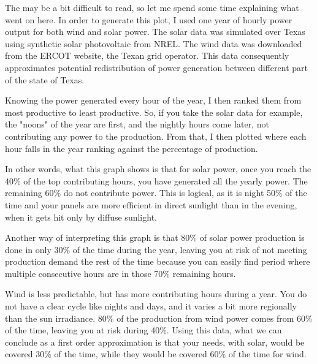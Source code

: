 The  may be a bit difficult to read, so let me spend some time explaining what went on here. In order to generate this plot, I used one year of hourly power output for both wind and solar power. The solar data was simulated over Texas using synthetic solar photovoltaic from NREL. The wind data was downloaded from the ERCOT website, the Texan grid operator. This data consequently approximates potential redistribution of power generation between different part of the state of Texas.

Knowing the power generated every hour of the year, I then ranked them from most productive to least productive. So, if you take the solar data for example, the "noons" of the year are first, and the nightly hours come later, not contributing any power to the production. From that, I then plotted where each hour falls in the year ranking against the percentage of production.

In other words, what this graph shows is that for solar power, once you reach the 40\% of the top contributing hours, you have generated all the yearly power. The remaining 60\% do not contribute power. This is logical, as it is night 50\% of the time and your panels are more efficient in direct sunlight than in the evening, when it gets hit only by diffuse sunlight.

Another way of interpreting this graph is that 80\% of solar power production is done in only 30\% of the time during the year, leaving you at risk of not meeting production demand the rest of the time because you can easily find period where multiple consecutive hours are in those 70\% remaining hours.

Wind is less predictable, but has more contributing hours during a year. You do not have a clear cycle like nights and days, and it varies a bit more regionally than the sun irradiance. 80\% of the production from wind power comes from 60\% of the time, leaving you at risk during 40\%. Using this data, what we can conclude as a first order approximation is that your needs, with solar, would be covered 30\% of the time, while they would be covered 60\% of the time for wind.

